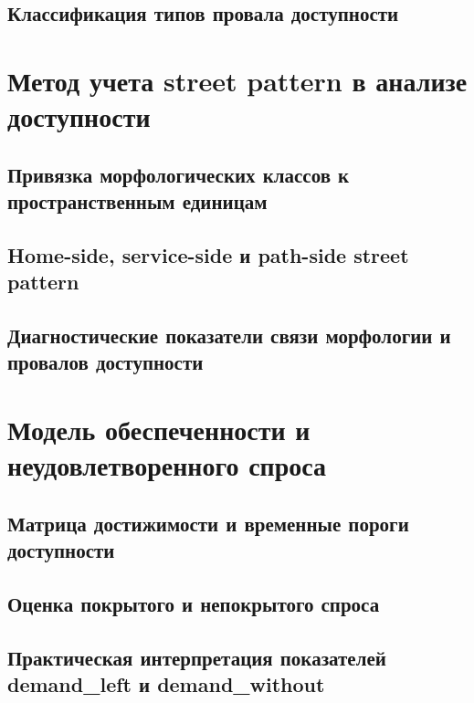\subsection{Классификация типов провала доступности}
\label{subsec:access-failure-types}

\section{Метод учета street pattern в анализе доступности}
\label{sec:street-pattern-method}

\subsection{Привязка морфологических классов к пространственным единицам}
\label{subsec:morphology-to-units}

\subsection{Home-side, service-side и path-side street pattern}
\label{subsec:street-pattern-sides}

\subsection{Диагностические показатели связи морфологии и провалов доступности}
\label{subsec:morphology-diagnostics}

\section{Модель обеспеченности и неудовлетворенного спроса}
\label{sec:provision-model}

\subsection{Матрица достижимости и временные пороги доступности}
\label{subsec:accessibility-matrix-thresholds}

\subsection{Оценка покрытого и непокрытого спроса}
\label{subsec:covered-uncovered-demand}

\subsection{Практическая интерпретация показателей demand\_left и demand\_without}
\label{subsec:demand-left-without}

